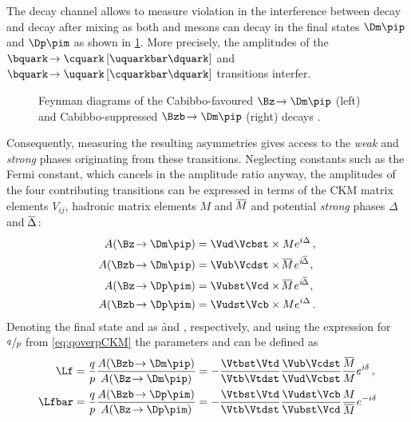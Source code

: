 The decay channel \BdToDpi allows to measure \CP violation in the interference between decay and decay after mixing as both \Bz and \Bzb mesons can decay in the final states $\Dm\pip$ and $\Dp\pim$ as shown in \cref{fig:feynmanBd2Dpi}.
More precisely, the amplitudes of the $\bquark\!\to\cquark\left[\uquarkbar\dquark\right]$ and $\bquark\!\to\uquark\left[\cquarkbar\dquark\right]$ transitions interfer.
\begin{figure}[tbp]
	\centering
	
	
	\caption{Feynman diagrams of the Cabibbo-favoured $\Bz\!\to\Dm\pip$ (left) and Cabibbo-suppressed $\Bzb\!\to\Dm\pip$ (right) decays \cite{Ellis:2016jkw}.}
	\label{fig:feynmanBd2Dpi}
\end{figure}
Consequently, measuring the resulting \CP asymmetries gives access to the \emph{weak} and \emph{strong} phases originating from these transitions.
Neglecting constants such as the Fermi constant, which cancels in the amplitude ratio anyway, the amplitudes of the four contributing transitions can be expressed in terms of the CKM matrix elements $V_{ij}^{\phantom{\ast}}$, hadronic matrix elements $M$ and $\overline{\kern -1.0pt M\kern -1.0pt}$ and potential \emph{strong} phases $\Delta$ and $\overline{\kern -1.0pt \Delta\kern -1.0pt}\,$:
\begin{align}
A\!\left(\Bz\!\to\Dm\pip\right)&=\Vud\Vcbst\times Me^{i\Delta}\,,\\
A\!\left(\Bzb\!\to\Dm\pip\right)&=\Vub\Vcdst\times \overline{\kern -1.0pt M\kern -1.0pt}\,e^{i\overline{\kern -1.0pt \Delta\kern -1.0pt}}\,,\\
A\!\left(\Bz\!\to\Dp\pim\right)&=\Vubst\Vcd\times \overline{\kern -1.0pt M\kern -1.0pt}\,e^{i\overline{\kern -1.0pt \Delta\kern -1.0pt}}\,,\\
A\!\left(\Bzb\!\to\Dp\pim\right)&=\Vudst\Vcb\times Me^{i\Delta}\,.
\end{align}
Denoting the final state \Dm\pip and \Dp\pim as \f and \fbar, respectively, and using the expression for $\nicefrac{q\,}{p}$ from \cref{eq:qoverpCKM} the parameters \Lf and \Lfbar can be defined as
\begin{align}
\Lf&=\frac{q}{p}\frac{A\!\left(\Bzb\!\to\Dm\pip\right)}{A\!\left(\Bz\!\to\Dm\pip\right)}=-\frac{\Vtbst\Vtd}{\Vtb\Vtdst}\frac{\Vub\Vcdst}{\Vud\Vcbst}\frac{\overline{\kern -1.0pt M\kern -1.0pt}}{M}e^{i\delta}\,,\\
\Lfbar&=\frac{q}{p}\frac{A\!\left(\Bzb\!\to\Dp\pim\right)}{A\!\left(\Bz\!\to\Dp\pim\right)}=-\frac{\Vtbst\Vtd}{\Vtb\Vtdst}\frac{\Vudst\Vcb}{\Vubst\Vcd}\frac{M}{\overline{\kern -1.0pt M\kern -1.0pt}}e^{-i\delta}
\end{align}
